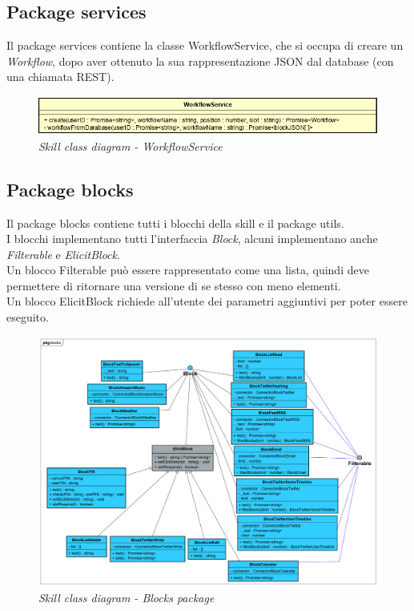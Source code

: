 \subsection{Package services}
Il package services contiene la classe WorkflowService, che si occupa di creare un \textit{Workflow}, dopo aver ottenuto la sua rappresentazione JSON dal database (con una chiamata REST).
\begin{figure} [H]
    \centering
	\includegraphics[scale=0.7]{./images/WorkflowService.PNG}
	\caption{\textit{Skill class diagram - WorkflowService}}\label{classlambda}
\end{figure}
\clearpage
\subsection{Package blocks}
Il package blocks contiene tutti i blocchi della skill e il package utils.\\
I blocchi implementano tutti l'interfaccia \textit{Block}, alcuni implementano anche \textit{Filterable} e \textit{ElicitBlock}.\\
Un blocco Filterable può essere rappresentato come una lista, quindi deve permettere di ritornare una versione di se stesso con meno elementi.\\
Un blocco ElicitBlock richiede all'utente dei parametri aggiuntivi per poter essere eseguito.
\begin{figure} [H]
    \centering
	\includegraphics[scale=0.24]{./images/ZeroSevenClassBlocks.png}
	\caption{\textit{Skill class diagram - Blocks package}}\label{classlambda}
\end{figure}
